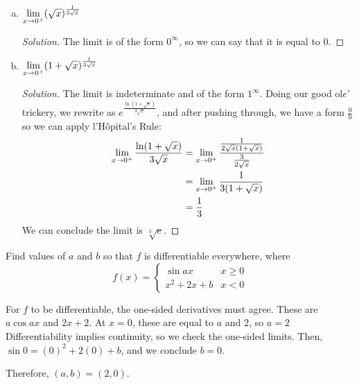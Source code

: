 \documentclass{agony}
\begin{document}
\begin{prob}
\begin{enumerate}[(a)]
\begin{proof}[Solution]
          \end{proof}
    \item $\lim\limits_{x\to0^+}(\sqrt{x})^{\frac{1}{3\sqrt{x}}}$
          \begin{proof}[Solution]
            The limit is of the form $0^\infty$, so we can say that it is equal to 0.
          \end{proof}
    \item $\lim\limits_{x\to0^+}(1+\sqrt{x})^{\frac{1}{3\sqrt{x}}}$
          \begin{proof}[Solution]
            The limit is indeterminate and of the form $1^{\infty}$.
            Doing our good ol$e$' trickery, we rewrite as $e^{\frac{\ln(1+\sqrt{x})}{3\sqrt{x}}}$,
            and after pushing through, we have a form $\frac{0}{0}$ so we can apply l'Hôpital's Rule:
            \begin{align*}
              \lim\limits_{x\to0^+} \frac{\ln(1+\sqrt{x})}{3\sqrt{x}}
               & = \lim\limits_{x\to0^+} \frac{\frac{1}{2\sqrt{x}(1+\sqrt{x})}}{\frac{3}{2\sqrt{x}}} \\
               & = \lim\limits_{x\to0^+} \frac{1}{3(1+\sqrt{x})}                                     \\
               & = \frac13
            \end{align*}
            We can conclude the limit is $\sqrt[3]{e}$.
          \end{proof}
  \end{enumerate}
\end{prob}

\begin{prob}
  Find values of $a$ and $b$ so that $f$ is differentiable everywhere, where
  \[ f(x) = \begin{cases}
      \sin ax      & x \geq 0 \\
      x^2 + 2x + b & x < 0
    \end{cases} \]
\end{prob}
\begin{sol}
  For $f$ to be differentiable, the one-sided derivatives must agree.
  These are $a\cos ax$ and $2x + 2$.
  At $x=0$, these are equal to $a$ and $2$, so $a=2$
  Differentiability implies continuity, so we check the one-sided limits.
  Then, $\sin 0 = (0)^2 + 2(0) + b$, and we conclude $b=0$.

  Therefore, $(a,b) = (2,0)$.
\end{sol}
\end{document}

